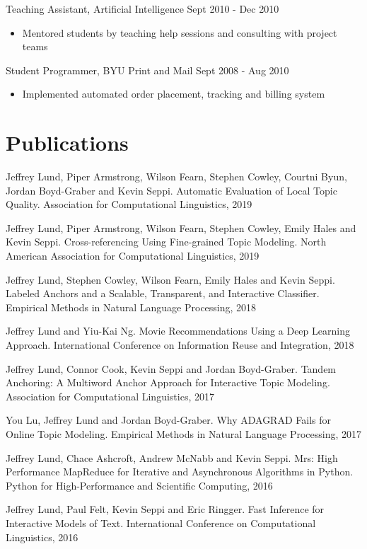 \documentclass[margin]{res}
\begin{document}
\begin{resume}
Teaching Assistant, Artificial Intelligence \hfill Sept 2010 - Dec 2010
\begin{itemize} \itemsep -2pt
\item Mentored students by teaching help sessions and consulting with project teams
\end{itemize}

Student Programmer, BYU Print and Mail \hfill Sept 2008 - Aug 2010
\begin{itemize} \itemsep -2pt
\item Implemented automated order placement, tracking and billing system
\end{itemize}


\section{Publications}

Jeffrey Lund, Piper Armstrong, Wilson Fearn, Stephen Cowley, Courtni Byun, Jordan Boyd-Graber and Kevin Seppi. Automatic Evaluation of Local Topic Quality. Association for Computational Linguistics, 2019

Jeffrey Lund, Piper Armstrong, Wilson Fearn, Stephen Cowley, Emily Hales and Kevin Seppi. Cross-referencing Using Fine-grained Topic Modeling. North American Association for Computational Linguistics, 2019

Jeffrey Lund, Stephen Cowley, Wilson Fearn, Emily Hales and Kevin Seppi. Labeled Anchors and a Scalable, Transparent, and Interactive Classifier. Empirical Methods in Natural Language Processing, 2018

Jeffrey Lund and Yiu-Kai Ng. Movie Recommendations Using a Deep Learning Approach. International Conference on Information Reuse and Integration, 2018

Jeffrey Lund, Connor Cook, Kevin Seppi and Jordan Boyd-Graber. Tandem Anchoring: A Multiword Anchor Approach for Interactive Topic Modeling. Association for Computational Linguistics, 2017

You Lu, Jeffrey Lund and Jordan Boyd-Graber. Why ADAGRAD Fails for Online Topic Modeling. Empirical Methods in Natural Language Processing, 2017

Jeffrey Lund, Chace Ashcroft, Andrew McNabb and Kevin Seppi. Mrs: High Performance MapReduce for Iterative and Asynchronous Algorithms in Python. Python for High-Performance and Scientific Computing, 2016

Jeffrey Lund, Paul Felt, Kevin Seppi and Eric Ringger. Fast Inference for Interactive Models of Text. International Conference on Computational Linguistics, 2016


\end{resume}
\end{document}

